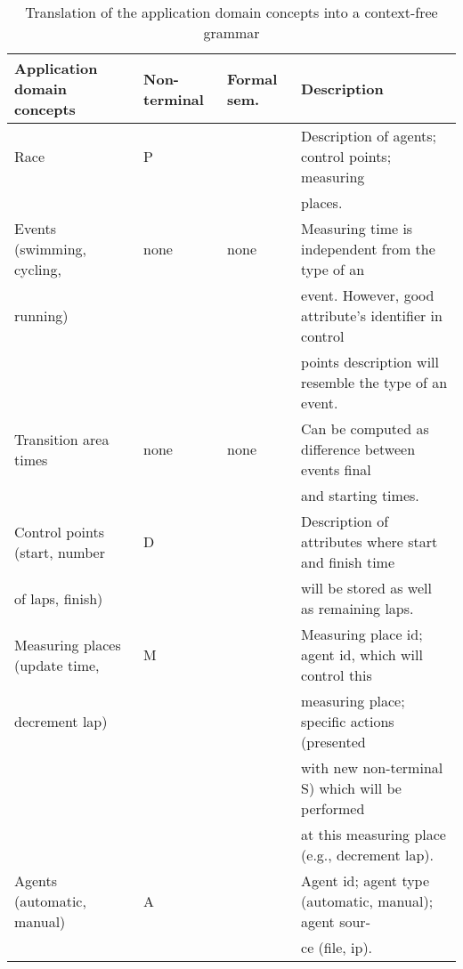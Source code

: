\documentclass[preprint, prX]{revtex4}
\begin{document}
\begin{table*}[htb]
\caption{Translation of the application domain concepts into a context-free grammar}
\label{tab:tab1}
\vspace{-5mm}
\scriptsize
\begin{center}
\begin{tabular}{ l  l  l  l }
\hline
Application domain concepts &  Non-terminal & Formal sem. & Description \\

\hline
Race & P &  & Description of agents; control points; measuring \\
 & & & places. \\
\hline
Events (swimming, cycling, & none & none & Measuring time is independent from the type of an \\
running) & & & event. However, good attribute's identifier in control \\
 & & & points description will resemble the type of an event. \\
\hline
Transition area times & none & none & Can be computed as difference between events final \\
 & & & and starting times. \\
\hline
Control points (start, number & D &  & Description of attributes where start and finish time \\
of laps, finish) & & & will be stored as well as remaining laps. \\
\hline
Measuring places (update time, & M &  & Measuring place id; agent id, which will control this \\
decrement lap) & & & measuring place; specific actions (presented \\
 & & & with new non-terminal S) which will be performed \\
 & & & at this measuring place (e.g., decrement lap). \\
\hline
Agents (automatic, manual) & A &  & Agent id; agent type (automatic, manual); agent sour- \\
 & & & ce (file, ip). \\
\hline
\end{tabular}
\end{center}
\normalsize
\vspace{-5mm}
\end{table*}
\end{document}
